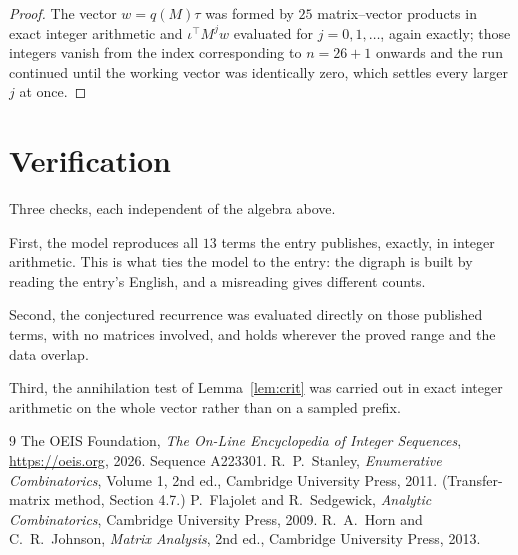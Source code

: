 \documentclass[11pt,a4paper]{article}
\theoremstyle{plain}
\theoremstyle{definition}
\begin{document}
\begin{proof}
The vector $w=q(M)\tau$ was formed by $25$ matrix--vector products in exact integer
arithmetic and $\iota^{\!\top}M^{j}w$ evaluated for $j=0,1,\dots$, again exactly; those
integers vanish from the index corresponding to $n=26+1$ onwards and the run continued
until the working vector was identically zero, which settles every larger $j$ at once.
\end{proof}

\section{Verification}

Three checks, each independent of the algebra above.

First, the model reproduces all $13$ terms the entry publishes, exactly, in integer
arithmetic. This is what ties the model to the entry: the digraph is built by reading the
entry's English, and a misreading gives different counts.

Second, the conjectured recurrence was evaluated directly on those published terms, with no
matrices involved, and holds wherever the proved range and the data overlap.

Third, the annihilation test of Lemma~\ref{lem:crit} was carried out in exact integer
arithmetic on the whole vector rather than on a sampled prefix.

\begin{thebibliography}{9}
 The OEIS Foundation, \emph{The On-Line Encyclopedia of Integer
Sequences}, \url{https://oeis.org}, 2026. Sequence A223301.
 R.~P.~Stanley, \emph{Enumerative Combinatorics}, Volume 1, 2nd ed.,
Cambridge University Press, 2011. (Transfer-matrix method, Section 4.7.)
 P.~Flajolet and R.~Sedgewick, \emph{Analytic Combinatorics}, Cambridge
University Press, 2009.
 R.~A.~Horn and C.~R.~Johnson, \emph{Matrix Analysis}, 2nd ed., Cambridge
University Press, 2013.
\end{thebibliography}
\end{document}
